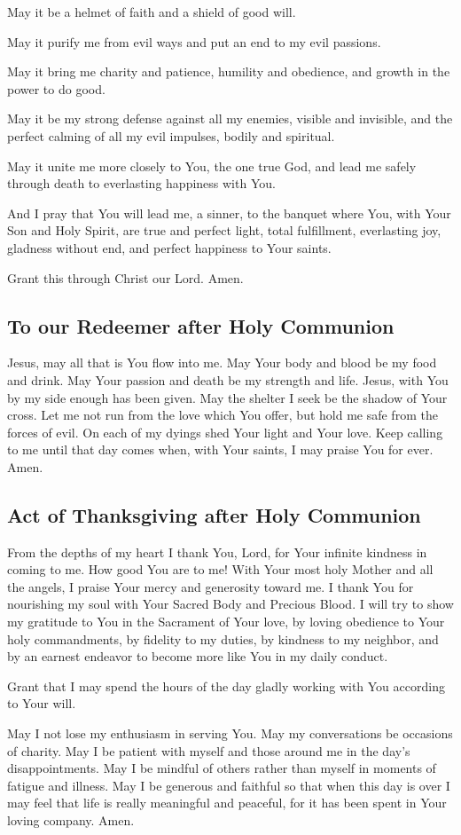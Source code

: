 \documentclass[12pt]{article}
\newcommand{\prayertitle}[1]{\subsection{#1}}
\begin{document}
May it be a helmet of faith and a shield of good will.

May it purify me from evil ways and put an end to my evil passions.

May it bring me charity and patience, humility and obedience, and growth in the power to do good.

May it be my strong defense against all my enemies, visible and invisible, and the perfect calming of all my evil impulses, bodily and spiritual.

May it unite me more closely to You, the one true God, and lead me safely through death to everlasting happiness with You.

And I pray that You will lead me, a sinner, to the banquet where You, with Your Son and Holy Spirit, are true and perfect light, total fulfillment, everlasting joy, gladness without end, and perfect happiness to Your saints.

Grant this through Christ our Lord. Amen.

\prayertitle{To our Redeemer after Holy Communion}
Jesus, may all that is You flow into me.
May Your body and blood be my food and drink.
May Your passion and death be my strength and life.
Jesus, with You by my side enough has been given.
May the shelter I seek be the shadow of Your cross.
Let me not run from the love which You offer, but hold me safe from the forces of evil.
On each of my dyings shed Your light and Your love.
Keep calling to me until that day comes when, with Your saints, I may praise You for ever.
Amen.

\prayertitle{Act of Thanksgiving after Holy Communion}
From the depths of my heart I thank You, Lord, for Your infinite kindness in coming to me.
How good You are to me!
With Your most holy Mother and all the angels, I praise Your mercy and generosity toward me.
I thank You for nourishing my soul with Your Sacred Body and Precious Blood.
I will try to show my gratitude to You in the Sacrament of Your love, by loving obedience to Your holy commandments, by fidelity to my duties, by kindness to my neighbor, and by an earnest endeavor to become more like You in my daily conduct.

Grant that I may spend the hours of the day gladly working with You according to Your will.

May I not lose my enthusiasm in serving You.
May my conversations be occasions of charity.
May I be patient with myself and those around me in the day's disappointments.
May I be mindful of others rather than myself in moments of fatigue and illness.
May I be generous and faithful so that when this day is over I may feel that life is really meaningful and peaceful, for it has been spent in Your loving company.
Amen.
\end{document}
